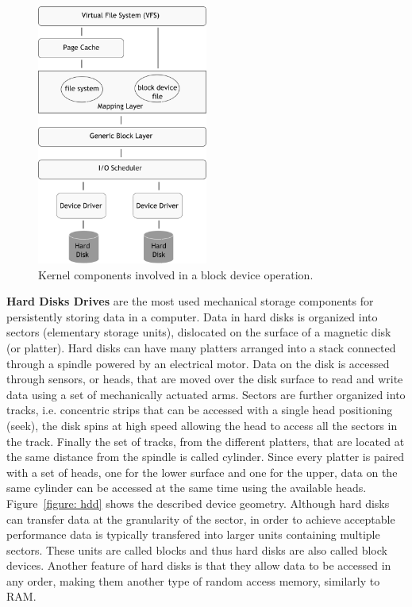 \begin{figure}[!htb]
  \centering
  \includegraphics[width=0.5\textwidth]{chapters/figures/io_architecture}
  \caption{Kernel components involved in a block device operation.}
  \label{figure: io-arch}
\end{figure}

\vspace{5mm}
\textbf{Hard Disks Drives} are the most used mechanical storage components for persistently storing data in a computer. Data in hard disks is organized into sectors (elementary storage units), 
dislocated on the surface of a magnetic disk (or platter). Hard disks can have many platters arranged into a stack connected through a spindle powered by an electrical motor. Data on the disk is 
accessed through sensors, or heads, that are moved over the disk surface to read and write data using a set of mechanically actuated arms. Sectors are further organized into tracks, i.e. concentric 
strips that can be accessed with a single head positioning (seek), the disk spins at high speed allowing the head to access all the sectors in the track. Finally the set of tracks, from the different 
platters, that are located at the same distance from the spindle is called cylinder. Since every platter is paired with a set of heads, one for the lower surface and one for the upper, data on the same
cylinder can be accessed at the same time using the available heads. Figure~\ref{figure: hdd} shows the described device geometry. Although hard disks can transfer data at the granularity of the 
sector, in order to achieve acceptable performance data is typically transfered into larger units containing multiple sectors. These units are called blocks and thus hard disks are also called block 
devices. Another feature of hard disks is that they allow data to be accessed in any order, making them another type of random access memory, similarly to RAM.

